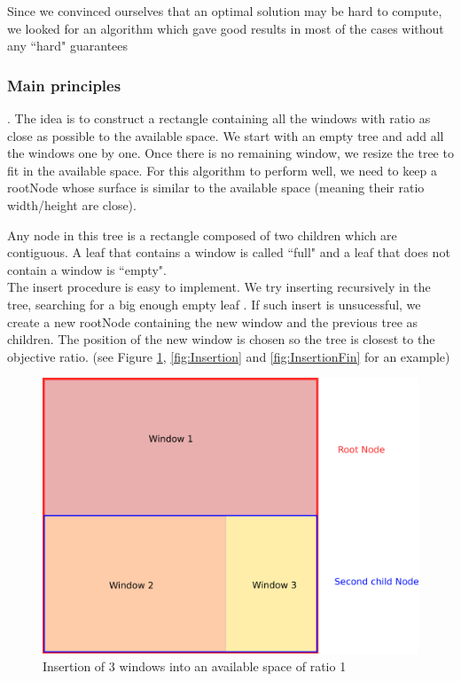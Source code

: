 \documentclass{acmtog}
\begin{document}
Since we convinced ourselves that an optimal solution may be hard to compute, we looked for an algorithm which gave good results in most of the cases without any ``hard" guarantees

\subsubsection{Main principles}

. The idea is to construct a rectangle containing all the windows with ratio as close as possible to the available space. We start with an empty tree and add all the windows one by one. Once there is no remaining window, we resize the tree to fit in the available space. For this algorithm to perform well, we need to keep a rootNode whose surface is similar to the available space (meaning their ratio width/height are close). 

Any node in this tree is a rectangle composed of two children which are contiguous. A leaf that contains a window is called ``full" and a leaf that does not contain a window is ``empty".  \\

The insert procedure is easy to implement. We try inserting recursively in the tree, searching for a big enough empty leaf . If such insert is unsucessful, we create a new rootNode containing the new window and the previous tree as children. The position of the new window is chosen so the tree is closest to the objective ratio. (see Figure \ref{fig:SimpleInsert}, \ref{fig:Insertion} and \ref{fig:InsertionFin} for an example)

\begin{figure}
  \includegraphics[width=\linewidth]{Images/1erDessin.png}
  \caption{Insertion of 3 windows into an available space of ratio 1}
  \label{fig:SimpleInsert}
\end{figure}
\end{document}
